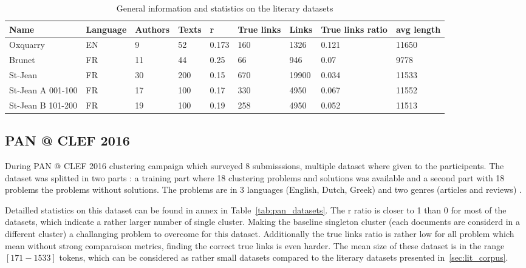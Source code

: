 \begin{table*}[t]
  \caption{General information and statistics on the literary datasets}
  \label{tab:lit_datasets}
  \begin{tabular}{|l|l|l|l|l|l|l|l|l|}
    \hline
    \textbf{Name} &
    \textbf{Language} &
    \textbf{Authors} &
    \textbf{Texts} &
    \textbf{r} &
    \textbf{True links} &
    \textbf{Links} &
    \textbf{True links ratio} &
    \textbf{avg length} \\ \hline
    Oxquarry & EN & 9 & 52 & 0.173 & 160 & 1326 & 0.121 & 11650 \\ \hline
    Brunet & FR & 11 & 44 & 0.25 & 66 & 946 & 0.07 & 9778 \\ \hline
    St-Jean & FR & 30 & 200 & 0.15 & 670 & 19900 & 0.034 & 11533 \\ \hline
    St-Jean A 001-100 & FR & 17 & 100 & 0.17 & 330 & 4950 & 0.067 & 11552 \\ \hline
    St-Jean B 101-200 & FR & 19 & 100 & 0.19 & 258 & 4950 & 0.052 & 11513 \\ \hline
  \end{tabular}
\end{table*}


\subsection{PAN @ CLEF 2016}

During PAN @ CLEF 2016 clustering campaign which surveyed 8 submisssions, multiple dataset where given to the participents.
The dataset was splitted in two parts : a training part where 18 clustering problems and solutions was available and a second part with 18 problems the problems without solutions.
The problems are in 3 languages (English, Dutch, Greek) and two genres (articles and reviews) \cite{pan16}.

Detailled statistics on this dataset can be found in annex in Table~\ref{tab:pan_datasets}.
The r ratio is closer to 1 than 0 for most of the datasets, which indicate a rather larger number of single cluster.
Making the baseline singleton cluster (each documents are considerd in a different cluster) a challanging problem to overcome for this dataset.
Additionally the true links ratio is rather low for all problem which mean without strong comparaison metrics, finding the correct true links is even harder.
The mean size of these dataset is in the range $[171-1533]$ tokens, which can be considered as rather small datasets compared to the literary datasets presented in~\ref{sec:lit_corpus}.

